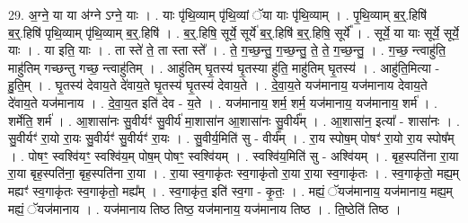 \documentclass[17pt]{extarticle}
\begin{document}
29. अ॒ग्ने॒ या या अ॑ग्ने ऽग्ने॒ याः । . याः पृ॑थि॒व्याम् पृ॑थि॒व्यां ॅया याः पृ॑थि॒व्याम् । . पृ॒थि॒व्याम् ब॒र्॒.हिषि॑ ब॒र्॒.हिषि॑ पृथि॒व्याम् पृ॑थि॒व्याम् ब॒र्॒.हिषि॑ । . ब॒र्॒.हिषि॒ सूर्ये॒ सूर्ये॑ ब॒र्॒.हिषि॑ ब॒र्॒.हिषि॒ सूर्ये᳚ । . सूर्ये॒ या याः सूर्ये॒ सूर्ये॒ याः । . या इति॒ याः । . ता स्ते॑ ते॒ ता स्ता स्ते᳚ । . ते॒ ग॒च्छ॒न्तु॒ ग॒च्छ॒न्तु॒ ते॒ ते॒ ग॒च्छ॒न्तु॒ । . ग॒च्छ॒ न्त्वाहु॑ति॒ माहु॑तिम् गच्छन्तु गच्छ॒ न्त्वाहु॑तिम् । . आहु॑तिम् घृ॒तस्य॑ घृ॒तस्या हु॑ति॒ माहु॑तिम् घृ॒तस्य॑ । . आहु॑ति॒मित्या - हु॒ति॒म् । . घृ॒तस्य॑ देवाय॒ते दे॑वाय॒ते घृ॒तस्य॑ घृ॒तस्य॑ देवाय॒ते । . दे॒वा॒य॒ते यज॑मानाय॒ यज॑मानाय देवाय॒ते दे॑वाय॒ते यज॑मानाय । . दे॒वा॒य॒त इति॑ देव - य॒ते । . यज॑मानाय॒ शर्म॒ शर्म॒ यज॑मानाय॒ यज॑मानाय॒ शर्म॑ । . शर्मेति॒ शर्म॑ । . आ॒शासा॑नः सु॒वीर्यꣳ॑ सु॒वीर्य॑ मा॒शासा॑न आ॒शासा॑नः सु॒वीर्य᳚म् । . आ॒शासा॑न॒ इत्या᳚ - शासा॑नः । . सु॒वीर्यꣳ॑ रा॒यो रा॒यः सु॒वीर्यꣳ॑ सु॒वीर्यꣳ॑ रा॒यः । . सु॒वीर्य॒मिति॑ सु - वीर्य᳚म् । . रा॒य स्पोष॒म् पोषꣳ॑ रा॒यो रा॒य स्पोष᳚म् । . पोषꣳ॒॒ स्वश्वि॑यꣳ॒॒ स्वश्वि॑य॒म् पोष॒म् पोषꣳ॒॒ स्वश्वि॑यम् । . स्वश्वि॑य॒मिति॑ सु - अश्वि॑यम् । . बृह॒स्पति॑ना रा॒या रा॒या बृह॒स्पति॑ना॒ बृह॒स्पति॑ना रा॒या । . रा॒या स्व॒गाकृ॑तः स्व॒गाकृ॑तो रा॒या रा॒या स्व॒गाकृ॑तः । . स्व॒गाकृ॑तो॒ मह्य॒म् मह्यꣳ॑ स्व॒गाकृ॑तः स्व॒गाकृ॑तो॒ मह्य᳚म् । . स्व॒गाकृ॑त॒ इति॑ स्व॒गा - कृ॒तः॒ । . मह्यं॒ ॅयज॑मानाय॒ यज॑मानाय॒ मह्य॒म् मह्यं॒ ॅयज॑मानाय । . यज॑मानाय तिष्ठ तिष्ठ॒ यज॑मानाय॒ यज॑मानाय तिष्ठ । . ति॒ष्ठेति॑ तिष्ठ । \newline
\end{document}
